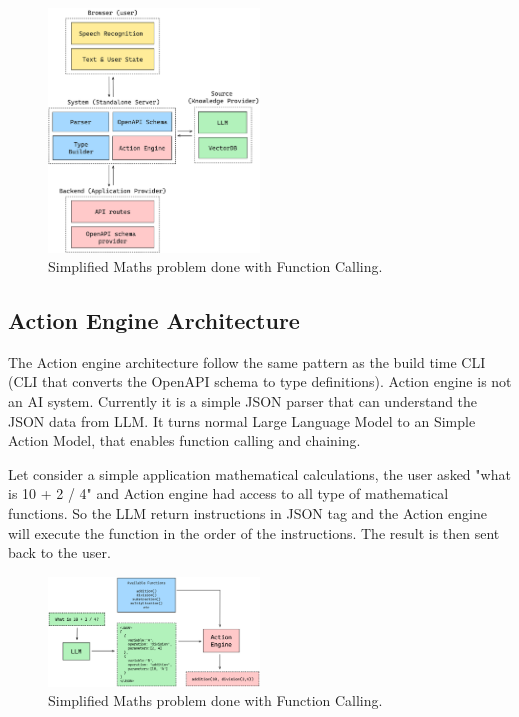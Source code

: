 \documentclass[conference]{IEEEtran}
\begin{document}
\begin{figure}[htbp]
    \centering
    \includegraphics[width=0.5\textwidth]{images/server.png}
    \caption{Simplified Maths problem done with Function Calling.}
    \label{fig}
\end{figure}


\subsection{Action Engine Architecture}
The Action engine architecture follow the same pattern as the build time CLI (CLI that converts the OpenAPI schema to type definitions). Action engine is not an AI system. Currently it is a simple JSON parser that can understand the JSON data from LLM. It turns normal Large Language Model to an Simple Action Model, that enables function calling and chaining. 

Let consider a simple application mathematical calculations, the user asked "what is 10 + 2 / 4" and Action engine had access to all type of mathematical functions. So the LLM return instructions in JSON tag and the Action engine will execute the function in the order of the instructions. The result is then sent back to the user. 


\begin{figure}[htbp]
    \centering
    \includegraphics[width=0.5\textwidth]{images/maths.png}
    \caption{Simplified Maths problem done with Function Calling.}
    \label{fig}
\end{figure}
\end{document}
